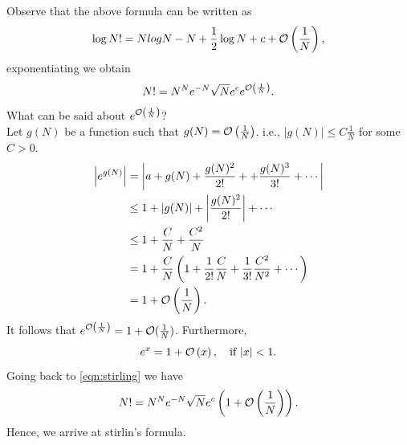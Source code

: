 \documentclass[12pt]{article}
\begin{document}
Observe that the above formula can be written as
\[
    \log N!=Nlog N-N+\frac{1}{2}\log N + c+\mathcal{O}\left(\frac{1}{N}\right),
\]
exponentiating we obtain
\begin{equation}\label{eqn:stirling}
    N!=N^Ne^{-N}\sqrt{N}e^ce^{\mathcal{O}\left(\frac{1}{N}\right)}.
\end{equation}
What can be said about $e^{\mathcal{O}\left(\frac{1}{N}\right)}$?\\
Let $g(N)$ be a function such that $g(N)=\mathcal{O}\left(\frac{1}{N}\right)$. i.e., $|g(N)|\leq C\frac{1}{N}$ for some $C>0$.
\begin{align*}
    \left|e^{g(N)}\right|&=\left|a+g(N)+\frac{g(N)^2}{2!}++\frac{g(N)^3}{3!}+\cdots\right|\\
    &\leq1+\left|g(N)\right|+\left|\frac{g(N)^2}{2!}\right|+\cdots\\
    &\leq1+\frac{C}{N}+\frac{C^2}{N}\\
    &=1+\frac{C}{N}\left(1+\frac{1}{2!}\frac{C}{N}+\frac{1}{3!}\frac{C^2}{N^2}+\cdots\right)\\
    &=1+\mathcal{O}\left(\frac{1}{N}\right).
\end{align*}
It follows that $e^{\mathcal{O}\left(\frac{1}{N}\right)}=1+\mathcal{O}(\frac{1}{N})$. Furthermore,
\[
    e^x=1+\mathcal{O}\left(x\right),\quad \text{if } |x|<1.
\]
Going back to \ref{eqn:stirling} we have
\[
    N!=N^Ne^{-N}\sqrt{N}e^c\left(1+\mathcal{O}\left(\frac{1}{N}\right)\right).
\]
Hence, we arrive at stirlin's formula.
\end{document}
